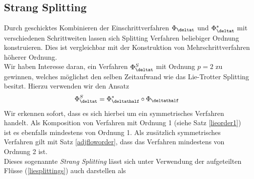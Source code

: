 \subsection{Strang Splitting}
\label{secstrang}
Durch geschicktes Kombinieren der Einschrittverfahren $\Phi_{\deltat}$ und $\Phi_{\deltat}^*$ mit verschiedenen Schrittweiten lassen sich Splitting Verfahren beliebiger Ordnung konstruieren. Dies ist vergleichbar mit der Konstruktion von Mehrschrittverfahren höherer Ordnung.\\
Wir haben Interesse daran, ein Verfahren $\Phi_{\deltat}^S$ mit Ordnung $p=2$ zu gewinnen, welches möglichst den selben Zeitaufwand wie das Lie-Trotter Splitting besitzt. Hierzu verwenden wir den Ansatz \[\Phi_{\deltat}^S=\Phi_{\deltathalf}^*\circ\Phi_{\deltathalf}\]
Wir erkennen sofort, dass es sich hierbei um ein symmetrisches Verfahren handelt. Als Komposition von Verfahren mit Ordnung 1 (siehe Satz \ref{lieorder1}) ist es ebenfalls mindestens von Ordnung 1. Als zusätzlich symmetrisches Verfahren gilt mit Satz \ref{adjfloworder}, dass das Verfahren mindestens von Ordnung 2 ist.\\
Dieses sogenannte \emph{Strang Splitting} lässt sich unter Verwendung der aufgeteilten Flüsse (\ref{liesplittings}) auch darstellen als 

